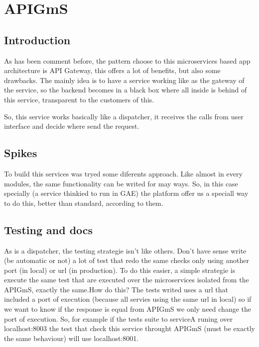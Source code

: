 \documentclass[oneside,english,titlepage]{scrbook}
\begin{document}
\section{APIGmS}

\subsection{Introduction}

As has been comment before, the pattern choose to this microservices
based app architecture is API Gateway, this offers a lot of benefits,
but also some drawbacks. The mainly idea is to have a service working
like as the gateway of the service, so the backend becomes in a black
box where all inside is behind of this service, transparent to the
customers of this.

So, this service works basically like a dispatcher, it receives the
calls from user interface and decide where send the request.

\subsection{Spikes}

To build this services was tryed some diferents approach. Like almost
in every modules, the same functionality can be writed for may ways.
So, in this case specially (a service thinkied to run in GAE) the
platform offer us a speciall way to do this, better than standard,
according to them.

\subsection{Testing and docs}

As is a dispatcher, the testing strategie isn't like others. Don't
have sense write (be automatic or not) a lot of test that redo the
same checks only using another port (in local) or url (in production).
To do this easier, a simple strategie is execute the same test that
are executed over the microservices isolated from the APIGmS, exactly
the same.\bigskip How do this? The tests writed uses a url that included
a port of execution (because all servies using the same url in local)
so if we want to know if the response is equal from APIGmS we only
need change the port of execution. So, for example if the tests suite
to serviceA runing over localhost:8003 the test that check this service
throught APIGmS (must be exactly the same behaviour) will use localhost:8001.
\end{document}
